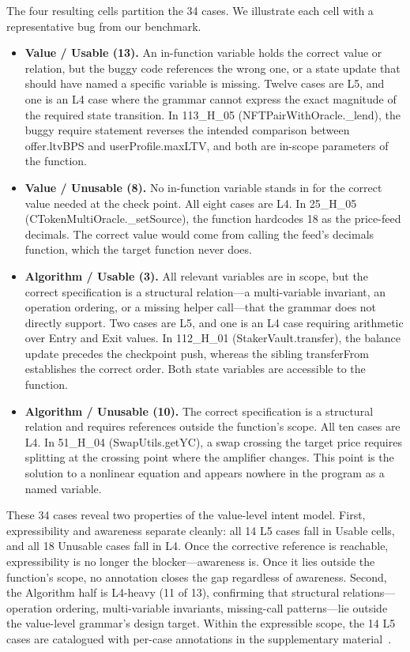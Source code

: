 \documentclass[pdflatex,sn-basic]{sn-jnl}%
\theoremstyle{thmstyleone}%
\theoremstyle{thmstyletwo}%
\theoremstyle{thmstylethree}%
\begin{document}
\begin{itemize}
  \noindent The four resulting cells partition the 34 cases. We illustrate each cell with a representative bug from our benchmark.
  \begin{itemize}
    \item \textbf{Value / Usable (13).} An in-function variable holds the correct value or relation, but the buggy code references the wrong one, or a state update that should have named a specific variable is missing. Twelve cases are L5, and one is an L4 case where the grammar cannot express the exact magnitude of the required state transition. In 113\_H\_05 (NFTPairWithOracle.\_lend), the buggy require statement reverses the intended comparison between offer.ltvBPS and userProfile.maxLTV, and both are in-scope parameters of the function.
    \item \textbf{Value / Unusable (8).} No in-function variable stands in for the correct value needed at the check point. All eight cases are L4. In 25\_H\_05 (CTokenMultiOracle.\_setSource), the function hardcodes 18 as the price-feed decimals. The correct value would come from calling the feed's decimals function, which the target function never does.
    \item \textbf{Algorithm / Usable (3).} All relevant variables are in scope, but the correct specification is a structural relation---a multi-variable invariant, an operation ordering, or a missing helper call---that the grammar does not directly support. Two cases are L5, and one is an L4 case requiring arithmetic over Entry and Exit values. In 112\_H\_01 (StakerVault.transfer), the balance update precedes the checkpoint push, whereas the sibling transferFrom establishes the correct order. Both state variables are accessible to the function.
    \item \textbf{Algorithm / Unusable (10).} The correct specification is a structural relation and requires references outside the function's scope. All ten cases are L4. In 51\_H\_04 (SwapUtils.getYC), a swap crossing the target price requires splitting at the crossing point where the amplifier changes. This point is the solution to a nonlinear equation and appears nowhere in the program as a named variable.
  \end{itemize}
  \noindent These 34 cases reveal two properties of the value-level intent model. First, expressibility and awareness separate cleanly: all 14 L5 cases fall in Usable cells, and all 18 Unusable cases fall in L4. Once the corrective reference is reachable, expressibility is no longer the blocker---awareness is. Once it lies outside the function's scope, no annotation closes the gap regardless of awareness. Second, the Algorithm half is L4-heavy (11 of 13), confirming that structural relations---operation ordering, multi-variable invariants, missing-call patterns---lie outside the value-level grammar's design target. Within the expressible scope, the 14 L5 cases are catalogued with per-case annotations in the supplementary material~\citep{rq2supp}.
\end{itemize}
\end{document}
